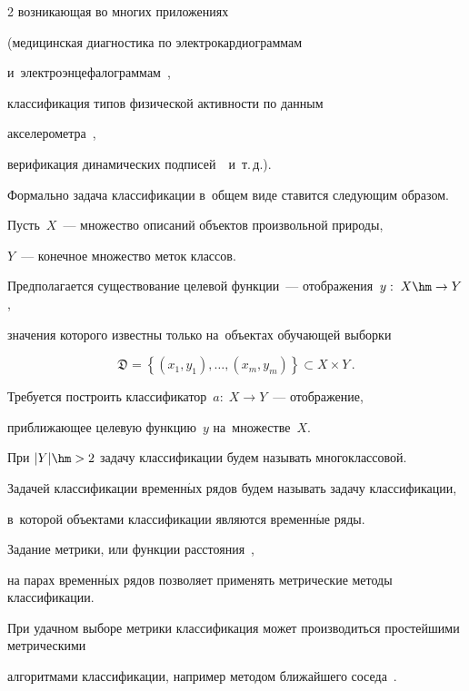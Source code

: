 \begin{multicols}{2}
возникающая во многих приложениях


  (медицинская диагностика по электрокардиограммам~\cite{basil2014automatic} 


  и~электроэнцефалограммам~\cite{alomari2013automated},


  классификация типов физической активности по данным 


  акселерометра~\cite{Kwapisz:2011:ARU:1964897.1964918},


  верификация динамических подписей~\cite{gruber2006signature}~и~т.\,д.).





Формально задача классификации в~общем виде ставится следующим образом.


Пусть~$X$~--- множество описаний объектов произвольной природы,


$Y$~--- конечное множество меток классов.


Предполагается существование целевой функции~--- отоб\-ра\-же\-ния~$y:\;X


\hm\to Y$,


значения которого известны только на~объектах обучающей выборки


$$


    \mathfrak{D} = \left\{(x_1,y_1),\dots,(x_m,y_m)\right\} \subset X\times Y\,.


$$


Требуется построить классификатор~$a:\;X\to Y$~--- отображение,


приближающее целевую функцию~$y$ на~множестве~$X$.


При $|Y|\hm>2$ задачу классификации будем называть многоклассовой.


Задачей классификации временн$\acute{\mbox{ы}}$х рядов будем называть задачу классификации, 


в~которой объектами классификации являются временн$\acute{\mbox{ы}}$е ряды.





Задание метрики, или функции расстояния~\cite{Ding:2008:QMT:1454159.1454226}, 


на парах временн$\acute{\mbox{ы}}$х рядов позволяет применять метрические методы классификации.


При удачном выборе метрики классификация может производиться простейшими метрическими 


алгоритмами классификации, например методом ближайшего соседа~\cite{jeong2011weighted}.



\end{multicols}
